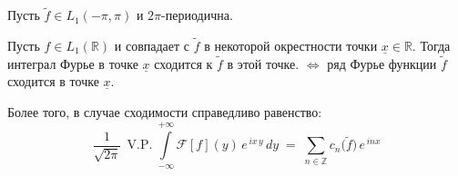 \begin{theorem}
    Пусть \( \tilde{f} \in L_1(-\pi, \pi) \) и \(2\pi\)-периодична.

    Пусть \( f \in L_1(\mathbb{R}) \) и совпадает с \( \widetilde{f} \) в некоторой окрестности точки \( \underline{x} \in \mathbb{R} \). Тогда интеграл Фурье в точке \(\underline{x}\) сходится к \(\widetilde{f}\) в этой точке. \(\Leftrightarrow\) ряд Фурье функции \(\widetilde{f}\) сходится в точке \(\underline{x}\).

    Более того, в случае сходимости справедливо равенство:
\[
\frac{1}{\sqrt{2\pi}}\,\operatorname{V.P.}
\int\limits_{-\infty}^{+\infty}
\mathcal{F}[f](y)\,e^{\,i x\,y}\,dy
\;=\;
\sum_{n\in\mathbb{Z}}
c_{n}\bigl(\widetilde{f}\bigr)\,e^{\,i n x}
\]
\end{theorem}


